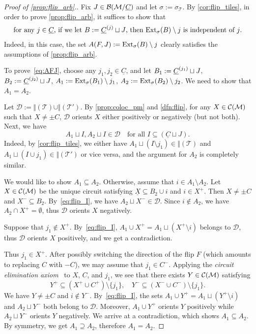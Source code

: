 \documentclass[11pt]{amsart}
\theoremstyle{plain}
\theoremstyle{definition}
\def\Tcal{\mathcal{T}}
\def\suppX{{\underline{X}}}
\def\suppC{{\underline{C}}}
\def\Tiling{\Tcal}
\def\WS{{\mathcal{D}}}
\def\eltminus{\setminus}
\let\subset\subseteq
\let\supset\supseteq
\begin{document}
\begin{proof}[Proof of \cref{prop:flip_arb}.]
Fix $J\in\BMC$ 
	and let $\sigma:=\sigma_\Tiling$.  By \cref{cor:flip_tiles}, in order to prove \cref{prop:flip_arb}, it suffices to show that 
\begin{equation}\label{eq:AFJ}
\text{for any 
	$j \in \suppC$, if we let 
	 $B:=\sC^{j}\sqcup J$, then $\ExtXX_{\sigma}(B) \eltminus j$ is 
		independent of $j$.}
\end{equation}
Indeed, in this case, the set $A(F,J):=\ExtXX_{\sigma}(B) \eltminus j$ clearly satisfies the assumptions of \cref{prop:flip_arb}. 

To prove~\eqref{eq:AFJ}, choose any
	 $j_1,j_2\in \suppC$, and 
	let $B_1:=\sC^{j_1}\sqcup J$, $B_2:=\sC^{j_2}\sqcup J$, $A_1:=\ExtXX_{\sigma}(B_1) \eltminus j_1$, $A_2:=\ExtXX_{\sigma}(B_2)\eltminus j_2$. We need to show that $A_1=A_2$.

Let $\WS:=\Vert(\Tiling)\cup \Vert(\Tiling')$. By \cref{prop:coloc_pm} and \cref{dfn:flip}, for any $X\in\mathcal{C}(\mathcal{M})$ such that $X\neq \pm C$,  $\WS$ orients $X$ either positively or negatively (but not both). Next, we have 
\begin{equation}\label{eq:flip_I}
A_1\sqcup I,A_2\sqcup I\in \WS\quad \text{for all $I\subset (\suppC\sqcup J)$.}
\end{equation}
Indeed,  by \cref{cor:flip_tiles}, we either have $A_1\sqcup (I\setminus j_1)\in\Vert(\Tiling)$ and $A_1\sqcup (I\cup j_1)\in\Vert(\Tiling')$ or vice versa, and the argument for $A_2$ is completely similar.

We would like to show $A_1\subset A_2$. Otherwise, assume that $i\in A_1\setminus A_2$. Let $X\in \mathcal{C}(\mathcal{M})$ be the unique circuit satisfying $\suppX\subset B_2\cup i$ and $i\in X^+$. Then $X\neq \pm C$ and $X^-\subset B_2$. By~\eqref{eq:flip_I}, we have $A_2\sqcup X^-\in \WS$. Since $i\notin A_2$, we have $A_2\cap X^+=\emptyset$, thus $\WS$ orients $X$ negatively.

Suppose that $j_1\notin X^+$. By~\eqref{eq:flip_I}, $A_1\cup X^+=A_1\sqcup (X^+\eltminus i)$ belongs to $\WS$, thus $\WS$ orients $X$ positively, and we get a contradiction.

Thus $j_1\in X^+$. After possibly switching the direction of the flip $F$ (which amounts to replacing $C$ with $-C$), we may assume that $j_1\in C^-$. Applying the \emph{circuit elimination axiom}~\cite[Definition~3.2.1~(C3)]{RedBook} to $X$, $C$, and $j_1$, we see that there exists $Y\in \mathcal{C}(\mathcal{M})$ satisfying 
\[Y^+\subset (X^+\cup C^+)\setminus\{j_1\},\quad Y^-\subset (X^-\cup C^-)\setminus\{j_1\}.\]
We have $Y\neq \pm C$ and $i\notin Y^-$. By~\eqref{eq:flip_I}, the sets $A_1\cup Y^+=A_1\sqcup (Y^+\eltminus i)$ and $A_2\sqcup Y^-$ both belong to $\WS$. Moreover, $A_1\cup Y^+$ orients $Y$ positively while $A_2\sqcup Y^-$ orients $Y$ negatively. We arrive at a contradiction, which shows $A_1\subset A_2$. By symmetry, we get $A_1\supset A_2$, therefore $A_1=A_2$.
\end{proof}
\end{document}
